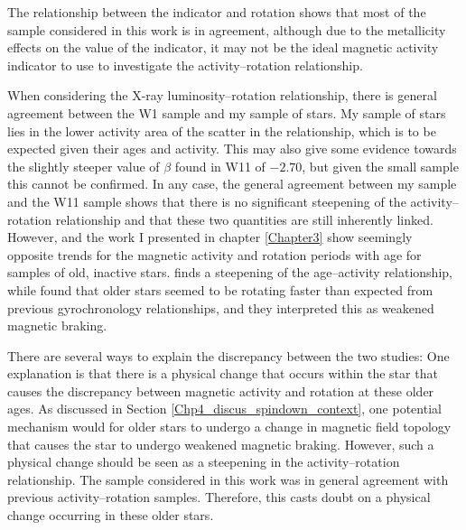 The relationship between the \Rprime indicator and rotation shows that most of the sample considered in this work is in agreement, although due to the metallicity effects on the value of the \Rprime indicator, it may not be the ideal magnetic activity indicator to use to investigate the activity--rotation relationship.

When considering the X-ray luminosity--rotation relationship, there is general agreement between the W1 sample and my sample of stars. My sample of stars lies in the lower activity area of the scatter in the relationship, which is to be expected given their ages and activity. This may also give some evidence towards the slightly steeper value of $\beta$ found in W11 of $-2.70$, but given the small sample this cannot be confirmed. In any case, the general agreement between my sample and the W11 sample shows that there is no significant steepening of the activity--rotation relationship and that these two quantities are still inherently linked. However, \citet{van_Saders_etal_2016} and the work I presented in chapter \ref{Chapter3} \citep{Booth_etal_2017} show seemingly opposite trends for the magnetic activity and rotation periods with age for samples of old, inactive stars. \citet{Booth_etal_2017} finds a steepening of the age--activity relationship, while \citet{van_Saders_etal_2016} found that older stars seemed to be rotating faster than expected from previous gyrochronology relationships, and they interpreted this as weakened magnetic braking.

There are several ways to explain the discrepancy between the two studies: One explanation is that there is a physical change that occurs within the star that causes the discrepancy between magnetic activity and rotation at these older ages. As discussed in Section \ref{Chp4_discus_spindown_context}, one potential mechanism would for older stars to undergo a change in magnetic field topology that causes the star to undergo weakened magnetic braking. However, such a physical change should be seen as a steepening in the activity--rotation relationship. The sample considered in this work was in general agreement with previous activity--rotation samples. Therefore, this casts doubt on a physical change occurring in these older stars. 

